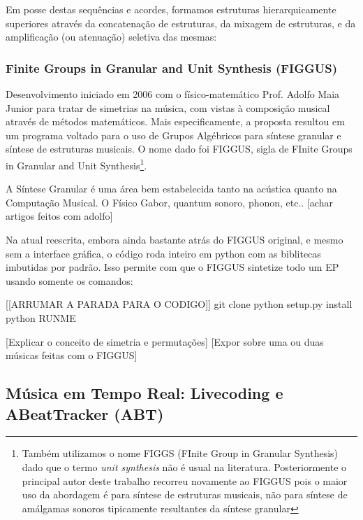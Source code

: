 
Em posse destas sequências e acordes, formamos estruturas hierarquicamente superiores
através da concatenação de estruturas, da mixagem de estruturas, e da amplificação
(ou atenuação) seletiva das mesmas:




        \subsubsection{Finite Groups in Granular and Unit Synthesis (FIGGUS)}

Desenvolvimento iniciado em 2006 com o físico-matemático Prof. Adolfo Maia Junior para
tratar de simetrias na música, com vistas à composição musical através
de métodos matemáticos. Mais especificamente, a proposta resultou em
um programa voltado para o uso de Grupos Algébricos para síntese
granular e síntese de estruturas musicais. O nome dado
foi FIGGUS, sigla de FInite Groups in Granular and Unit Synthesis\footnote{Também utilizamos
o nome FIGGS (FInite Group in Granular Synthesis) dado que o termo \emph{unit synthesis} não
é usual na literatura. Posteriormente o principal autor deste trabalho recorreu novamente
ao FIGGUS pois o maior uso da abordagem é para síntese de estruturas musicais, não para
síntese de amálgamas sonoros tipicamente resultantes da síntese granular}.

A Síntese Granular é uma área bem estabelecida tanto na acústica quanto
na Computação Musical. O Físico Gabor, quantum sonoro, phonon, etc..
[achar artigos feitos com adolfo]

Na atual reescrita, embora ainda bastante atrás do FIGGUS original,
e mesmo sem a interface gráfica, o código roda inteiro em python
com as biblitecas imbutidas por padrão. Isso permite com que o FIGGUS
sintetize todo um EP usando somente os comandos:

[[ARRUMAR A PARADA PARA O CODIGO]]
git clone
python setup.py install
python RUNME

[Explicar o conceito de simetria e permutações]
[Expor sobre uma ou duas músicas feitas com o FIGGUS]

  \subsection{Música em Tempo Real: Livecoding e ABeatTracker (ABT)}


